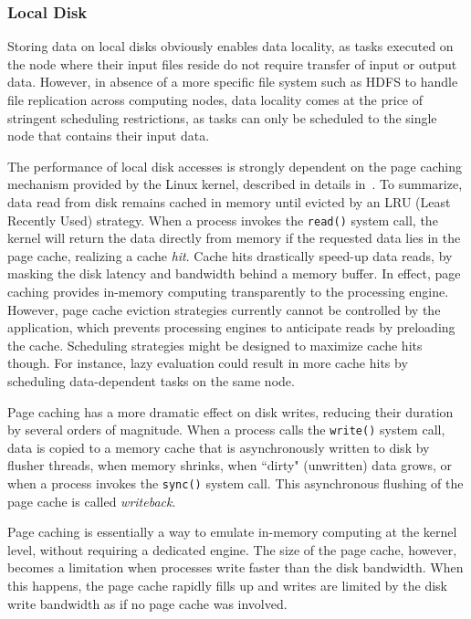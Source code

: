 \documentclass{IEEEtran}
\begin{document}
\subsubsection{Local Disk} %


Storing data on local disks obviously enables data locality, as tasks 
executed on the node where their input files reside do not require 
transfer of input or output data. However, in absence of a more specific 
file system such as HDFS to handle 
file replication across computing nodes, data locality comes at the price
of stringent scheduling restrictions, as tasks can only be scheduled to the
single node that contains their input data.


The performance of local disk accesses is strongly dependent on the 
page caching mechanism provided by the Linux kernel, described in    
details in~\cite{love2010linux}. To summarize, data read from disk 
remains cached in memory until evicted by an LRU (Least Recently Used) 
strategy. When a process invokes the \texttt{read()} system call, the 
kernel will return the data directly from memory if the requested data 
lies in the page cache, realizing a cache \emph{hit}. Cache hits drastically speed-up data 
reads, by masking the disk latency and bandwidth behind a 
memory buffer. In effect, page caching provides in-memory computing 
transparently to the processing engine. However, page cache eviction 
strategies currently cannot be controlled by the application, which 
prevents processing engines to anticipate reads by preloading the 
cache. Scheduling strategies might be designed 
to maximize cache hits though. For instance, lazy 
evaluation could result in more cache hits by scheduling data-dependent 
tasks on the same node.

Page caching has a more dramatic effect on disk writes, reducing their 
duration by several orders of magnitude. When a process calls the 
\texttt{write()} system call, data is copied to a memory cache that is 
asynchronously written to disk by flusher threads, when memory shrinks, when
``dirty" (unwritten) data grows, or when a 
process invokes the \texttt{sync()} system call. 
This asynchronous flushing of the page cache is called 
\emph{writeback}.

Page caching is essentially a way to 
emulate in-memory computing at the kernel level, without requiring a 
dedicated engine. The size of the page cache, however, becomes a 
limitation when processes write faster than the disk bandwidth. When 
this happens, the page cache rapidly fills up and writes are limited by 
the disk write bandwidth as if no page cache was involved.
\end{document}
